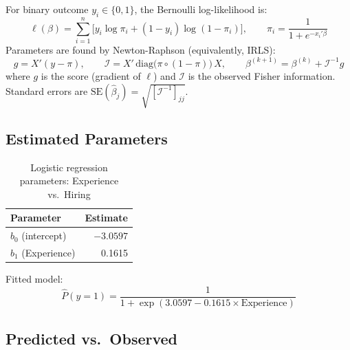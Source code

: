 \documentclass[12pt,a4paper]{article}
\begin{document}
For binary outcome $y_i \in \{0,1\}$, the Bernoulli log-likelihood is:
\[
  \ell(\beta) = \sum_{i=1}^{n}\bigl[y_i\log\pi_i + (1-y_i)\log(1-\pi_i)\bigr],
  \qquad \pi_i = \frac{1}{1+e^{-x_i'\beta}}
\]
Parameters are found by Newton-Raphson (equivalently, IRLS):
\[
  g = X'(y - \pi), \qquad
  \mathcal{I} = X'\,\mathrm{diag}\!\bigl(\pi\circ(1-\pi)\bigr)\,X, \qquad
  \beta^{(k+1)} = \beta^{(k)} + \mathcal{I}^{-1}g
\]
where $g$ is the score (gradient of $\ell$) and $\mathcal{I}$ is the observed Fisher
information. Standard errors are $\mathrm{SE}(\hat{\beta}_j) = \sqrt{[\mathcal{I}^{-1}]_{jj}}$.

\subsection{Estimated Parameters}

\begin{table}[H]
\centering
\caption{Logistic regression parameters: Experience vs.\ Hiring}
\begin{tabular}{lr}
\toprule
Parameter & Estimate \\
\midrule
$b_0$ (intercept)   & $-3.0597$ \\
$b_1$ (Experience)  &  0.1615  \\
\bottomrule
\end{tabular}
\end{table}

Fitted model:
\[
  \hat{P}(y=1) = \frac{1}{1 + \exp(3.0597 - 0.1615\times\text{Experience})}
\]

\subsection{Predicted vs.\ Observed}
\end{document}
